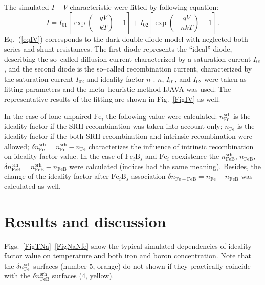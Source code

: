 ﻿\documentclass[12pt]{article}
\begin{document}
The simulated $I-V$ characteristic were fitted by following equation:
\begin{equation}
\label{eqIV}
    I=I_{01}\left[\exp\left(-\frac{qV}{kT}\right)-1\right]+ I_{02}\left[\exp\left(-\frac{qV}{nkT}\right)-1\right]\,.
\end{equation}
Eq.~(\ref{eqIV}) corresponds to the dark double diode model with neglected both series and shunt resistances.
The first diode represents the ``ideal'' diode, describing the so--called diffusion current characterized by a saturation current $I_{01}$,
and the second diode is the so--called recombination current, characterized by the saturation current $I_{02}$ and ideality factor $n$ \cite{Breitenstein2013}.
$n$, $I_{01}$, and $I_{02}$ were taken as fitting parameters and the meta--heuristic method IJAVA \cite{IJAVA} was used.
The representative results of the fitting are shown in Fig.~\ref{FigIV} as well.


In the case of lone unpaired $\mathrm{Fe}_i$ the following value were calculated:
$n_\mathrm{Fe}^\mathrm{srh}$ is the ideality factor if the SRH recombination was taken into account only;
$n_\mathrm{Fe}$ is the ideality factor if the both SRH recombination and intrinsic recombination were allowed;
$\delta n_\mathrm{Fe}^\mathrm{srh}=n_\mathrm{Fe}^\mathrm{srh}-n_\mathrm{Fe}$ characterizes the influence of intrinsic recombination on ideality factor value.
In the case of $\mathrm{Fe}_i\mathrm{B}_s$ and $\mathrm{Fe}_i$ coexistence the
$n_\mathrm{FeB}^\mathrm{srh}$, $n_\mathrm{FeB}$, $\delta n_\mathrm{FeB}^\mathrm{srh}=n_\mathrm{FeB}^\mathrm{srh}-n_\mathrm{FeB}$ were calculated (indices had the same meaning).
Besides, the change of the ideality factor after $\mathrm{Fe}_i\mathrm{B}_s$ association $\delta n_\mathrm{Fe-FeB}=n_\mathrm{Fe}-n_\mathrm{FeB}$ was calculated as well.


\section{Results and discussion}

Figs.~\ref{FigTNa}--\ref{FigNaNfe} show the typical simulated dependencies of ideality factor value on temperature and both iron and boron concentration.
Note that the $\delta n_\mathrm{Fe}^\mathrm{srh}$ surfaces (number 5, orange) do not shown if they practically coincide with
the $\delta n_\mathrm{FeB}^\mathrm{srh}$ surfaces (4, yellow).
\end{document}
